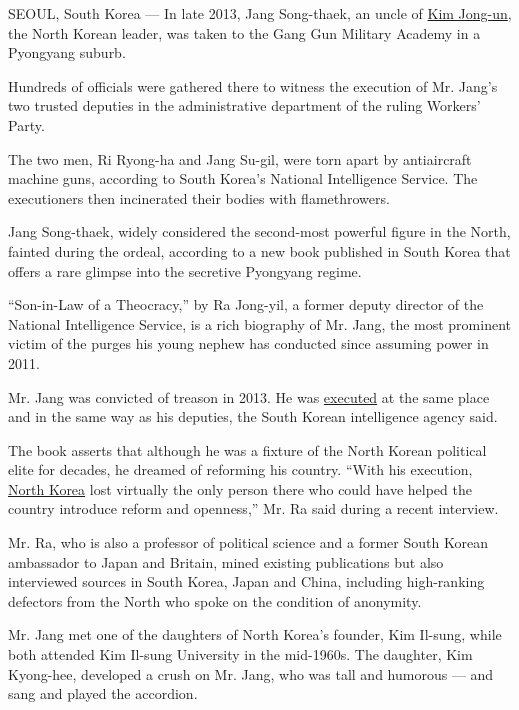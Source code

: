 SEOUL, South Korea --- In late 2013, Jang Song-thaek, an uncle of
\href{http://topics.nytimes3xbfgragh.onion/top/reference/timestopics/people/k/kim_jongun/index.html?inline=nyt-per}{Kim
Jong-un}, the North Korean leader, was taken to the Gang Gun Military
Academy in a Pyongyang suburb.

Hundreds of officials were gathered there to witness the execution of
Mr. Jang's two trusted deputies in the administrative department of the
ruling Workers' Party.

The two men, Ri Ryong-ha and Jang Su-gil, were torn apart by
antiaircraft machine guns, according to South Korea's National
Intelligence Service. The executioners then incinerated their bodies
with flamethrowers.

Jang Song-thaek, widely considered the second-most powerful figure in
the North, fainted during the ordeal, according to a new book published
in South Korea that offers a rare glimpse into the secretive Pyongyang
regime.

``Son-in-Law of a Theocracy,'' by Ra Jong-yil, a former deputy director
of the National Intelligence Service, is a rich biography of Mr. Jang,
the most prominent victim of the purges his young nephew has conducted
since assuming power in 2011.

Mr. Jang was convicted of treason in 2013. He was
\href{http://www.nytimes3xbfgragh.onion/2013/12/13/world/asia/north-korea-says-uncle-of-executed.html?_r=0}{executed}
at the same place and in the same way as his deputies, the South Korean
intelligence agency said.

The book asserts that although he was a fixture of the North Korean
political elite for decades, he dreamed of reforming his country. ``With
his execution,
\href{http://topics.nytimes3xbfgragh.onion/top/news/international/countriesandterritories/northkorea/index.html?inline=nyt-geo}{North
Korea} lost virtually the only person there who could have helped the
country introduce reform and openness,'' Mr. Ra said during a recent
interview.

Mr. Ra, who is also a professor of political science and a former South
Korean ambassador to Japan and Britain, mined existing publications but
also interviewed sources in South Korea, Japan and China, including
high-ranking defectors from the North who spoke on the condition of
anonymity.

Mr. Jang met one of the daughters of North Korea's founder, Kim Il-sung,
while both attended Kim Il-sung University in the mid-1960s. The
daughter, Kim Kyong-hee, developed a crush on Mr. Jang, who was tall and
humorous --- and sang and played the accordion.

